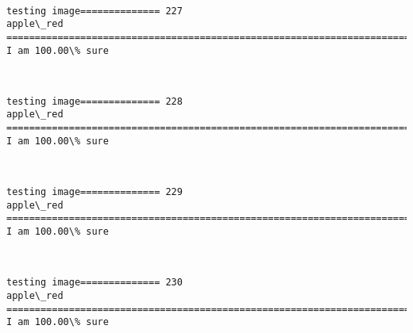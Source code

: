 \documentclass[11pt]{article}
\begin{document}
    \begin{center}
    \end{center}
    { \hspace*{\fill} \\}
    
    \begin{Verbatim}[commandchars=\\\{\}]
testing image============== 227
apple\_red
============================================================================
I am 100.00\% sure

    \end{Verbatim}

    \begin{center}
    \end{center}
    { \hspace*{\fill} \\}
    
    \begin{Verbatim}[commandchars=\\\{\}]
testing image============== 228
apple\_red
============================================================================
I am 100.00\% sure

    \end{Verbatim}

    \begin{center}
    \end{center}
    { \hspace*{\fill} \\}
    
    \begin{Verbatim}[commandchars=\\\{\}]
testing image============== 229
apple\_red
============================================================================
I am 100.00\% sure

    \end{Verbatim}

    \begin{center}
    \end{center}
    { \hspace*{\fill} \\}
    
    \begin{Verbatim}[commandchars=\\\{\}]
testing image============== 230
apple\_red
============================================================================
I am 100.00\% sure

    \end{Verbatim}
\end{document}
